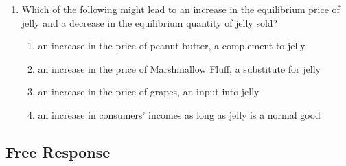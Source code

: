 \documentclass{article}
\begin{document}
\begin{enumerate}
\item Which of the following might lead to an increase in the equilibrium price of jelly and a decrease in the equilibrium quantity of jelly sold?

	\begin{enumerate}
	
	\item an increase in the price of peanut butter, a complement to jelly
	
	\item an increase in the price of Marshmallow Fluff, a substitute for jelly
	
	\item an increase in the price of grapes, an input into jelly
	
	\item an increase in consumers' incomes as long as jelly is a normal good
	
	\end{enumerate}

\end{enumerate}

\subsection*{Free Response}
\end{document}

